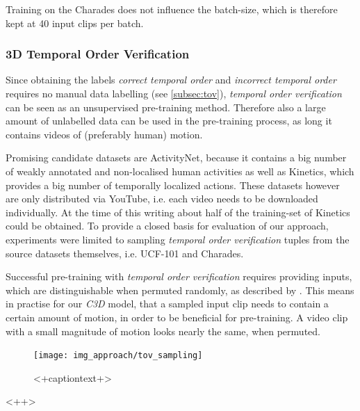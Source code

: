 Training on the Charades does not influence the batch-size, which is therefore kept at 40 input clips per batch.

\subsubsection{3D Temporal Order Verification}
Since obtaining the labels \textit{correct temporal order} and \textit{incorrect temporal order} requires no manual data labelling (see \ref{subsec:tov}), \textit{temporal order verification} can be seen as an unsupervised pre-training method.
Therefore also a large amount of unlabelled data can be used in the pre-training process, as long it contains videos of (preferably human) motion.

Promising candidate datasets are ActivityNet, because it contains a big number of weakly annotated and non-localised human activities as well as Kinetics, which provides a big number of temporally localized actions.
These datasets however are only distributed via YouTube, i.e. each video needs to be downloaded individually.
At the time of this writing about half of the training-set of Kinetics could be obtained.
To provide a closed basis for evaluation of our approach, experiments were limited to sampling \textit{temporal order verification} tuples from the source datasets themselves, i.e. UCF-101 and Charades.

Successful pre-training with \textit{temporal order verification} requires providing inputs, which are distinguishable when permuted randomly, as described by \textcite{misra_shuffle_2016}.
This means in practise for our \textit{C3D} model, that a sampled input clip needs to contain a certain amount of motion, in order to be beneficial for pre-training.
A video clip with a small magnitude of motion looks nearly the same, when permuted.

\begin{figure}[H]
    \centering
    \texttt{[image: img\_approach/tov\_sampling]}
    \caption{<+captiontext+>}
    \label{fig:<+label+>}
\end{figure}<++>
